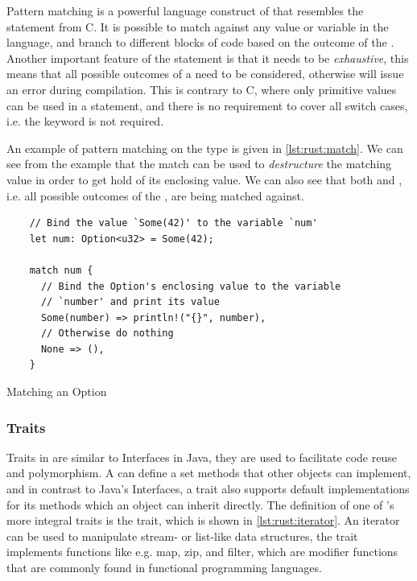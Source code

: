 Pattern matching is a powerful language construct of {\rust} that resembles the  statement from C.
It is possible to match against any value or variable in the language, and branch to different blocks of code based on the outcome of the .
Another important feature of the  statement is that it needs to be \emph{exhaustive}, this means that all possible outcomes of a  need to be considered, otherwise {\rust} will issue an error during compilation.
This is contrary to C, where only primitive values can be used in a  statement, and there is no requirement to cover all switch cases, i.e. the  keyword is not required.

An example of pattern matching on the  type is given in \autoref{lst:rust:match}.
We can see from the example that the match can be used to \emph{destructure} the matching value in order to get hold of its enclosing value.
We can also see that both  and , i.e. all possible outcomes of the , are being matched against.

\begin{listing}[H]
  \begin{verbatim}
    // Bind the value `Some(42)' to the variable `num'
    let num: Option<u32> = Some(42);

    match num {
      // Bind the Option's enclosing value to the variable
      // `number' and print its value
      Some(number) => println!("{}", number),
      // Otherwise do nothing
      None => (),
    }
  \end{verbatim}
  \caption{Matching an Option}
  \label{lst:rust:match}
\end{listing}

\subsubsection{Traits}

Traits in {\rust} are similar to Interfaces in Java, they are used to facilitate code reuse and polymorphism.
A  can define a set methods that other objects can implement, and in contrast to Java's Interfaces, a trait also supports default implementations for its methods which an object can inherit directly.
The definition of one of {\rust}'s more integral traits is the  trait, which is shown in \autoref{lst:rust:iterator}.
An iterator can be used to manipulate stream- or list-like data structures, the trait implements functions like e.g. map, zip, and filter, which are modifier functions that are commonly found in functional programming languages.

